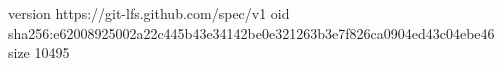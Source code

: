 version https://git-lfs.github.com/spec/v1
oid sha256:e62008925002a22c445b43e34142be0e321263b3e7f826ca0904ed43c04ebe46
size 10495
